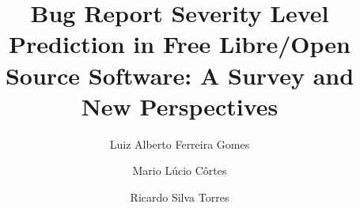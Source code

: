 \documentclass[review]{elsarticle}
\begin{document}
\begin{frontmatter}

\title{Bug Report Severity Level Prediction in Free Libre/Open Source Software: A Survey and New Perspectives}

\author{Luiz Alberto Ferreira Gomes}
\author{Mario Lúcio Côrtes}
\author{Ricardo Silva Torres}
\address{Institute of Computing, Campinas}

%
%

\begin{abstract}
    
\end{abstract}

\begin{keyword}
    
\end{keyword}

\end{frontmatter}












\end{document}
